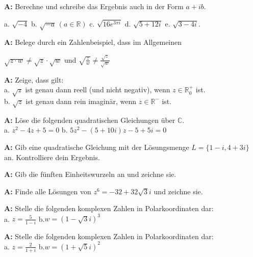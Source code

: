 \documentclass[landscape,twocolumn,a4paper]{article}
\begin{document}
\textbf{A:} Berechne und schreibe das Ergebnis auch in der Form $a + ib$.

a. $\sqrt{-4}$  \quad  b. $\sqrt{-a} \, (a \in \mathbb{R})$ \quad c. $\sqrt{16 e^{3\pi i}}$  
\quad d. $\sqrt{5 + 12 i}$ \quad e. $\sqrt{3 - 4 i}$.
\bigskip {}

\textbf{A:} Belege durch ein Zahlenbeispiel, dass im Allgemeinen 

$\sqrt{z \cdot w }  \neq \sqrt{z} \cdot \sqrt{w} $ und $\sqrt{\frac{z}{w}} \neq \frac{\sqrt{z}}{\sqrt{w}}$

\bigskip {}

\textbf{A:} Zeige, dass gilt: \\
a. $\sqrt{z}$ ist genau dann reell (und nicht negativ), wenn $z \in \mathbb{R}_{0}^{+}$ ist. \\
b. $\sqrt{z}$ ist genau dann rein imaginär, wenn $z \in \mathbb{R}^{-}$ ist. 
\bigskip {}

\textbf{A:} Löse die folgenden quadratischen Gleichungen über $\mathbb{C}$. \\
a. $z^2 - 4z + 5 = 0$ \quad b. $5z^2 - (5 + 10i)z - 5 + 5i = 0$
\bigskip {}

\textbf{A:} Gib eine quadratische Gleichung mit der Lösungsmenge $L = \{1-i, 4+3i\}$ an. 
Kontrolliere dein Ergebnis.
\bigskip {}

\textbf{A:} Gib die fünften Einheitswurzeln an und zeichne sie.
\bigskip {}

\textbf{A:} Finde alle Lösungen von $z^6 = -32 + 32\sqrt{3}i$ und zeichne sie.
\bigskip {}

\textbf{A:} Stelle die folgenden komplexen Zahlen in Polarkoordinaten dar: \\
a. $z = \frac{5}{1-i}$ \quad b.$w = (1-\sqrt{3} i)^3$
\bigskip {}

\textbf{A:} Stelle die folgenden komplexen Zahlen in Polarkoordinaten dar: \\
a. $z = \frac{2}{1+i}$ \quad b.$w = (1+\sqrt{5} i)^2$
\bigskip {}
\end{document}
